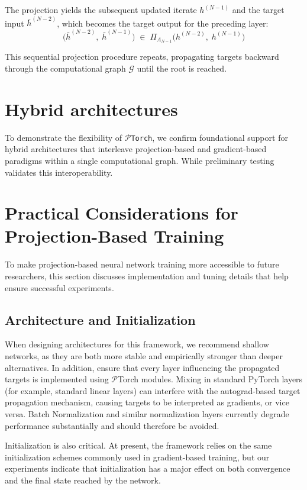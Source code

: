 \documentclass{article}
\begin{document}
The projection yields the subsequent updated iterate $h^{(N-1)}$ and the target input $\bar{h}^{(N-2)}$, which becomes the target output for the preceding layer:
\begin{equation}
\bigl(\bar{h}^{(N-2)},\; \bar h^{(N-1)}\bigr) \;\in\; \Pi_{A_{N-1}}\!\bigl(h^{(N-2)},\; h^{(N-1)}\bigr)
\end{equation}

This sequential projection procedure repeats, propagating targets backward through the computational graph $\mathcal{G}$ until the root is reached.

\section{Hybrid architectures}
To demonstrate the flexibility of \texttt{$\mathcal{P}$Torch}, we confirm foundational support for hybrid architectures that interleave projection-based and gradient-based paradigms within a single computational graph. While preliminary testing validates this interoperability.

\section{Practical Considerations for Projection-Based Training}
To make projection-based neural network training more accessible to future researchers, this section discusses implementation and tuning details that help ensure successful experiments.

\subsection{Architecture and Initialization}
\label{sec:arch-init}
When designing architectures for this framework, we recommend shallow networks, as they are both more stable and empirically stronger than deeper alternatives. In addition, ensure that every layer influencing the propagated targets is implemented using $\mathcal{P}$Torch modules. Mixing in standard PyTorch layers (for example, standard linear layers) can interfere with the autograd-based target propagation mechanism, causing targets to be interpreted as gradients, or vice versa. Batch Normalization and similar normalization layers currently degrade performance substantially and should therefore be avoided.

Initialization is also critical. At present, the framework relies on the same initialization schemes commonly used in gradient-based training, but our experiments indicate that initialization has a major effect on both convergence and the final state reached by the network.
\end{document}
